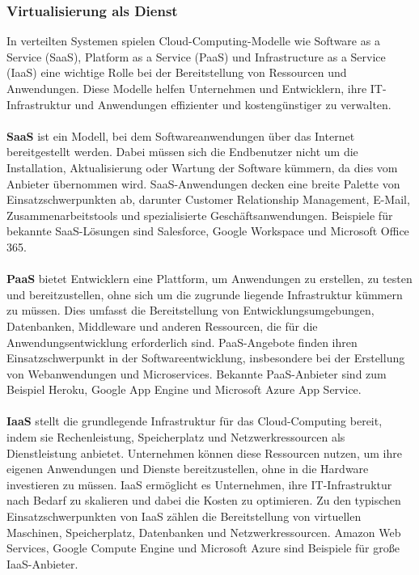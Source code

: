 \subsubsection{Virtualisierung als Dienst}

In verteilten Systemen spielen Cloud-Computing-Modelle wie Software as a Service (SaaS), Platform as a Service (PaaS) und Infrastructure as a Service (IaaS) eine wichtige Rolle bei der Bereitstellung von Ressourcen und Anwendungen. Diese Modelle helfen Unternehmen und Entwicklern, ihre IT-Infrastruktur und Anwendungen effizienter und kostengünstiger zu verwalten.
\\\\
\textbf{SaaS} ist ein Modell, bei dem Softwareanwendungen über das Internet bereitgestellt werden. Dabei müssen sich die Endbenutzer nicht um die Installation, Aktualisierung oder Wartung der Software kümmern, da dies vom Anbieter übernommen wird. SaaS-Anwendungen decken eine breite Palette von Einsatzschwerpunkten ab, darunter Customer Relationship Management, E-Mail, Zusammenarbeitstools und spezialisierte Geschäftsanwendungen. Beispiele für bekannte SaaS-Lösungen sind Salesforce, Google Workspace und Microsoft Office 365.
\\\\
\textbf{PaaS} bietet Entwicklern eine Plattform, um Anwendungen zu erstellen, zu testen und bereitzustellen, ohne sich um die zugrunde liegende Infrastruktur kümmern zu müssen. Dies umfasst die Bereitstellung von Entwicklungsumgebungen, Datenbanken, Middleware und anderen Ressourcen, die für die Anwendungsentwicklung erforderlich sind. PaaS-Angebote finden ihren Einsatzschwerpunkt in der Softwareentwicklung, insbesondere bei der Erstellung von Webanwendungen und Microservices. Bekannte PaaS-Anbieter sind zum Beispiel Heroku, Google App Engine und Microsoft Azure App Service.
\\\\
\textbf{IaaS} stellt die grundlegende Infrastruktur für das Cloud-Computing bereit, indem sie Rechenleistung, Speicherplatz und Netzwerkressourcen als Dienstleistung anbietet. Unternehmen können diese Ressourcen nutzen, um ihre eigenen Anwendungen und Dienste bereitzustellen, ohne in die Hardware investieren zu müssen. IaaS ermöglicht es Unternehmen, ihre IT-Infrastruktur nach Bedarf zu skalieren und dabei die Kosten zu optimieren. Zu den typischen Einsatzschwerpunkten von IaaS zählen die Bereitstellung von virtuellen Maschinen, Speicherplatz, Datenbanken und Netzwerkressourcen. Amazon Web Services, Google Compute Engine und Microsoft Azure sind Beispiele für große IaaS-Anbieter.
